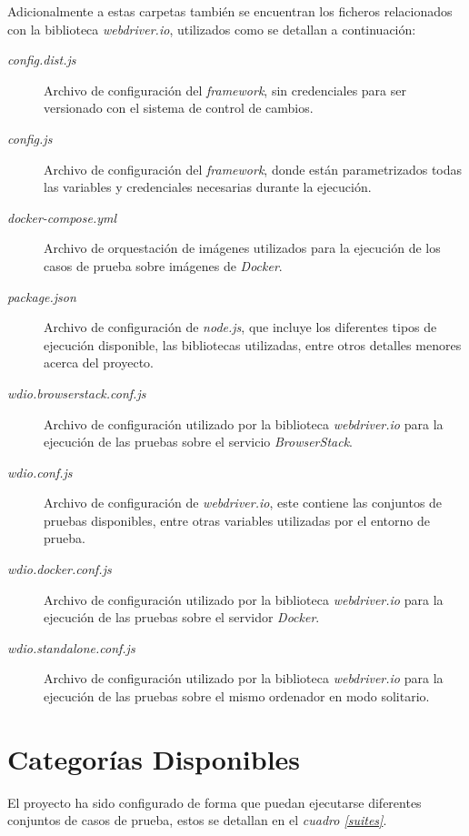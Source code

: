 Adicionalmente a estas carpetas también se encuentran los ficheros relacionados
con la biblioteca \emph{webdriver.io}, utilizados como se detallan a
continuación:

\begin{description}
    \item [\emph{config.dist.js}] Archivo de configuración del \emph{framework},
    sin credenciales para ser versionado con el sistema de control de cambios.
\item [\emph{config.js}] Archivo de configuración del \emph{framework}, donde
    están parametrizados todas las variables y credenciales necesarias durante
    la ejecución.
\item [\emph{docker-compose.yml}] Archivo de orquestación de imágenes utilizados
    para la ejecución de los casos de prueba sobre imágenes de \emph{Docker}.
\item [\emph{package.json}] Archivo de configuración de \emph{node.js}, que
    incluye los diferentes tipos de ejecución disponible, las bibliotecas
    utilizadas, entre otros detalles menores acerca del proyecto.
\item [\emph{wdio.browserstack.conf.js}] Archivo de configuración utilizado por
    la biblioteca \emph{webdriver.io} para la ejecución de las pruebas sobre el
    servicio \emph{BrowserStack}.
\item [\emph{wdio.conf.js}] Archivo de configuración de \emph{webdriver.io},
    este contiene las conjuntos de pruebas disponibles, entre otras variables
    utilizadas por el entorno de prueba.
\item [\emph{wdio.docker.conf.js}] Archivo de configuración utilizado por la
    biblioteca \emph{webdriver.io} para la ejecución de las pruebas sobre el
    servidor \emph{Docker}.
\item [\emph{wdio.standalone.conf.js}] Archivo de configuración utilizado por la
    biblioteca \emph{webdriver.io} para la ejecución de las pruebas sobre el
    mismo ordenador en modo solitario.
\end{description}

\section{Categorías Disponibles}
El proyecto ha sido configurado de forma que puedan ejecutarse diferentes
conjuntos de casos de prueba, estos se detallan en el
\emph{cuadro \ref{suites}}.


